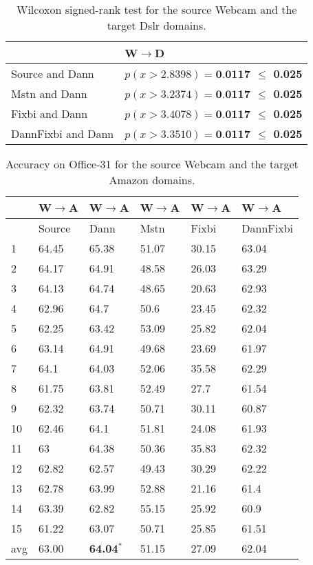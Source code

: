 \begin{table}[H]
\centering
\caption{Wilcoxon signed-rank test for the source Webcam and the target Dslr domains.}
\label{tab:WD_wil}
\begin{tabular}{|l|l|}
\hline
 & W$\rightarrow$D \\ \hline
Source and Dann & \textbf{$p(x > 2.8398) = \textbf{0.0117}$ $\leq$ 0.025} \\ \hline
Mstn and Dann & \textbf{$p(x > 3.2374) = \textbf{0.0117}$ $\leq$ 0.025} \\ \hline
Fixbi and Dann & \textbf{$p(x > 3.4078) = \textbf{0.0117}$ $\leq$ 0.025} \\\hline
DannFixbi and Dann & \textbf{$p(x > 3.3510)= \textbf{0.0117}$ $\leq$ 0.025} \\ \hline
\end{tabular}
\end{table} 

\begin{table}[H]
\centering
\caption{Accuracy on Office-31 for the source Webcam and the target Amazon domains.}
\label{tab:WA}
\begin{tabular}{|p{2cm}|p{2cm}|p{2cm}|p{2cm}|p{2cm}|p{2cm}|}
\hline
   & W$\rightarrow$A & W$\rightarrow$A & W$\rightarrow$A & W$\rightarrow$A & W$\rightarrow$A \\ \hline
 & Source & Dann & Mstn & Fixbi & DannFixbi \\ \hline
1 & 64.45 & 65.38 & 51.07 & 30.15 & 63.04 \\ \hline
2 & 64.17 & 64.91 & 48.58 & 26.03 & 63.29 \\ \hline
3 & 64.13 & 64.74 & 48.65 & 20.63 & 62.93 \\ \hline
4 & 62.96 & 64.7 & 50.6 & 23.45 & 62.32 \\ \hline
5 & 62.25 & 63.42 & 53.09 & 25.82 & 62.04 \\ \hline
6 & 63.14 & 64.91 & 49.68 & 23.69 & 61.97 \\ \hline
7 & 64.1 & 64.03 & 52.06 & 35.58 & 62.29 \\ \hline
8 & 61.75 & 63.81 & 52.49 & 27.7 & 61.54 \\ \hline
9 & 62.32 & 63.74 & 50.71 & 30.11 & 60.87 \\ \hline
10 & 62.46 & 64.1 & 51.81 & 24.08 & 61.93 \\ \hline
11 & 63 & 64.38 & 50.36 & 35.83 & 62.32 \\ \hline
12 & 62.82 & 62.57 & 49.43 & 30.29 & 62.22 \\ \hline
13 & 62.78 & 63.99 & 52.88 & 21.16 & 61.4 \\ \hline
14 & 63.39 & 62.82 & 55.15 & 25.92 & 60.9 \\ \hline
15 & 61.22 & 63.07 & 50.71 & 25.85 & 61.51 \\ \hline
avg & 63.00 & \textbf{64.04}$^*$ & 51.15 & 27.09 & 62.04 \\ \hline
\end{tabular}
\end{table}

